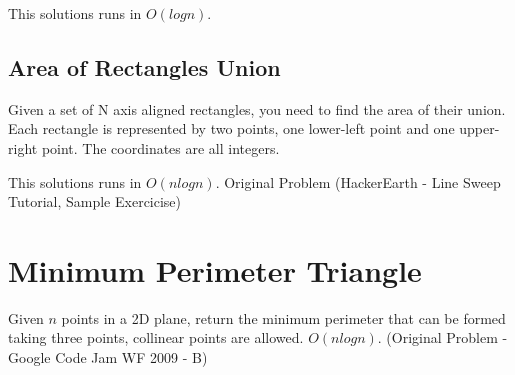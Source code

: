 \documentclass{report}
\begin{document}
            This solutions runs in $O(logn)$.
            
            
        \newpage
        \subsection{Area of Rectangles Union}
        Given a set of N axis aligned rectangles, you need to find the area of their union. Each rectangle is represented by two points, one lower-left point and one upper-right point. The coordinates are all integers.
        
        This solutions runs in $O(nlogn)$. Original Problem (HackerEarth - Line Sweep Tutorial, Sample Exercicise)
    \newpage
    \section{Minimum Perimeter Triangle}
    Given $n$ points in a 2D plane, return the minimum perimeter that can be formed taking three points, collinear points are allowed. $O(nlogn)$. (Original Problem - Google Code Jam WF 2009 - B)
    
    
    
\end{document}
